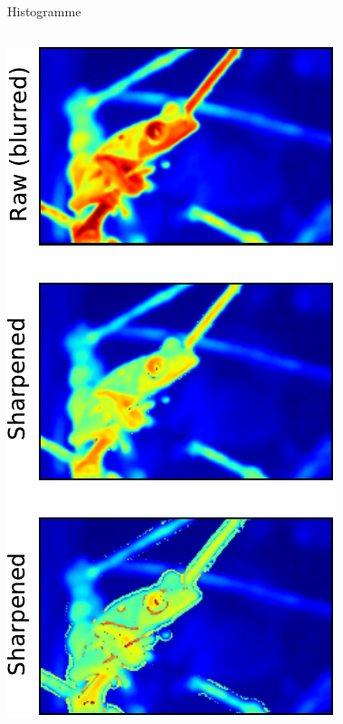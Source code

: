 \documentclass[8pt,a4paper]{beamer}
\begin{document}
\begin{frame}[containsverbatim]{Histogramme}
  \begin{columns}
  \includegraphics[width=\textwidth]{figures/grenouille_sharpen.pdf} 
  
    \end{columns}
\end{frame}  
\end{document}
